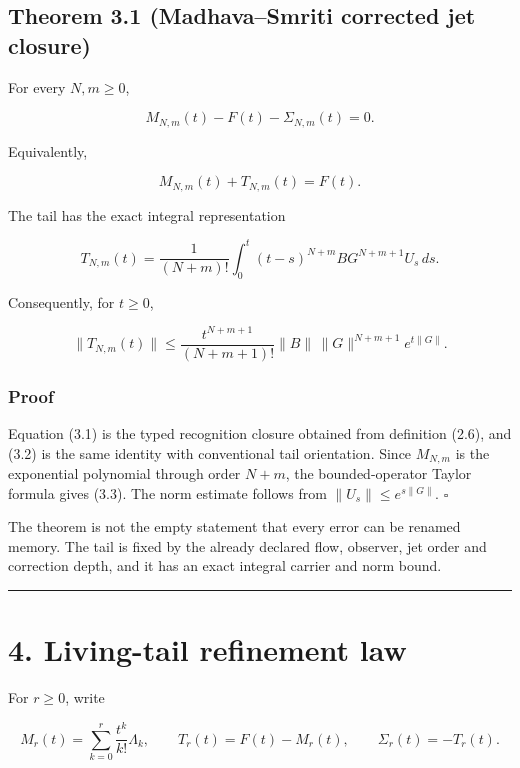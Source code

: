 \hypertarget{theorem-3.1-madhavasmriti-corrected-jet-closure}{%
\subsection{Theorem 3.1 (Madhava--Smriti corrected jet closure)}\label{theorem-3.1-madhavasmriti-corrected-jet-closure}}

For every \(N,m\ge0\),

\[
\boxed{
M_{N,m}(t)-F(t)-\Sigma_{N,m}(t)=0.
}
\tag{3.1}
\]

Equivalently,

\[
\boxed{M_{N,m}(t)+T_{N,m}(t)=F(t).}
\tag{3.2}
\]

The tail has the exact integral representation

\[
\boxed{
T_{N,m}(t)
=
\frac{1}{(N+m)!}
\int_0^t
(t-s)^{N+m}BG^{N+m+1}U_s\,ds.
}
\tag{3.3}
\]

Consequently, for \(t\ge0\),

\[
\boxed{
\|T_{N,m}(t)\|
\le
\frac{t^{N+m+1}}{(N+m+1)!}
\|B\|\,\|G\|^{N+m+1}e^{t\|G\|}.
}
\tag{3.4}
\]

\hypertarget{proof}{%
\subsubsection{Proof}\label{proof}}

Equation (3.1) is the typed recognition closure obtained from definition
(2.6), and (3.2) is the same identity with conventional tail orientation.
Since \(M_{N,m}\) is the exponential polynomial through order \(N+m\), the
bounded-operator Taylor formula gives (3.3). The norm estimate follows from
\(\|U_s\|\le e^{s\|G\|}\). \(\square\)

The theorem is not the empty statement that every error can be renamed
memory. The tail is fixed by the already declared flow, observer, jet order and
correction depth, and it has an exact integral carrier and norm bound.

\begin{center}\rule{0.5\linewidth}{0.5pt}\end{center}

\hypertarget{living-tail-refinement-law}{%
\section{4. Living-tail refinement law}\label{living-tail-refinement-law}}

For \(r\ge0\), write

\[
M_r(t)=\sum_{k=0}^{r}\frac{t^k}{k!}\Lambda_k,
\qquad
T_r(t)=F(t)-M_r(t),
\qquad
\Sigma_r(t)=-T_r(t).
\tag{4.1}
\]

